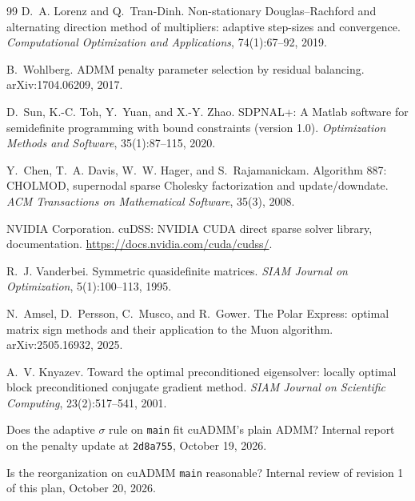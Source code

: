 \documentclass[11pt]{article}
\begin{document}
\begin{thebibliography}{99}
D.~A. Lorenz and Q.~Tran-Dinh.
\newblock Non-stationary Douglas--Rachford and alternating direction method of multipliers: adaptive
step-sizes and convergence.
\newblock \emph{Computational Optimization and Applications}, 74(1):67--92, 2019.

B.~Wohlberg.
\newblock ADMM penalty parameter selection by residual balancing.
\newblock arXiv:1704.06209, 2017.

D.~Sun, K.-C. Toh, Y.~Yuan, and X.-Y. Zhao.
\newblock SDPNAL+: A Matlab software for semidefinite programming with bound constraints (version 1.0).
\newblock \emph{Optimization Methods and Software}, 35(1):87--115, 2020.

Y.~Chen, T.~A. Davis, W.~W. Hager, and S.~Rajamanickam.
\newblock Algorithm 887: CHOLMOD, supernodal sparse Cholesky factorization and update/downdate.
\newblock \emph{ACM Transactions on Mathematical Software}, 35(3), 2008.

NVIDIA Corporation.
\newblock cuDSS: NVIDIA CUDA direct sparse solver library, documentation.
\newblock \url{https://docs.nvidia.com/cuda/cudss/}.

R.~J. Vanderbei.
\newblock Symmetric quasidefinite matrices.
\newblock \emph{SIAM Journal on Optimization}, 5(1):100--113, 1995.

N.~Amsel, D.~Persson, C.~Musco, and R.~Gower.
\newblock The Polar Express: optimal matrix sign methods and their application to the Muon algorithm.
\newblock arXiv:2505.16932, 2025.

A.~V. Knyazev.
\newblock Toward the optimal preconditioned eigensolver: locally optimal block preconditioned conjugate
gradient method.
\newblock \emph{SIAM Journal on Scientific Computing}, 23(2):517--541, 2001.

Does the adaptive $\sigma$ rule on \texttt{main} fit cuADMM's plain ADMM?
\newblock Internal report on the penalty update at \texttt{2d8a755}, October 19, 2026.

Is the reorganization on cuADMM \texttt{main} reasonable?
\newblock Internal review of revision 1 of this plan, October 20, 2026.

\end{thebibliography}
\end{document}

